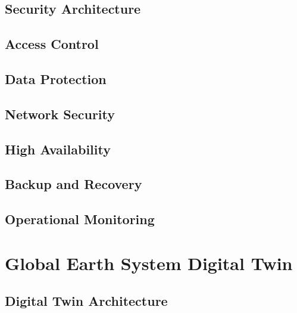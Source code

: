 \documentclass[11pt,a4paper,oneside]{report}
\begin{document}
\chapter{Security Architecture}



\chapter{Access Control}



\chapter{Data Protection}



\chapter{Network Security}



\chapter{High Availability}



\chapter{Backup and Recovery}



\chapter{Operational Monitoring}




\part{Global Earth System Digital Twin}


\chapter{Digital Twin Architecture}

\end{document}
